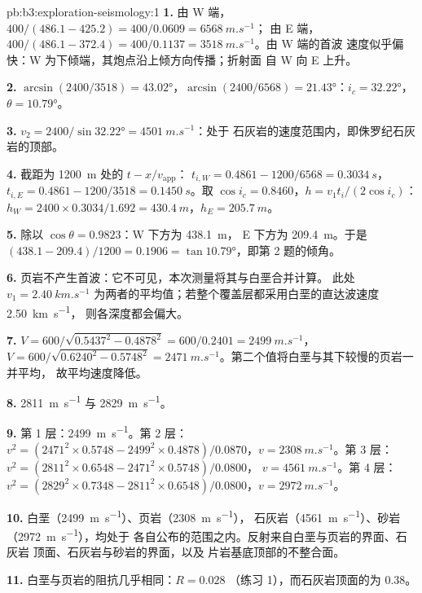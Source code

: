 \begin{solution}{pb:b3:exploration-seismology:1}
\textbf{1.} 由 W 端，$400/(486.1 - 425.2) = 400/0.0609 = \qty{6568}{m.s^{-1}}$；
由 E 端，$400/(486.1 - 372.4) = 400/0.1137 = \qty{3518}{m.s^{-1}}$。由 W 端的首波
速度似乎偏快：W 为下倾端，其炮点沿上倾方向传播；折射面
自 W 向 E 上升。

\textbf{2.} $\arcsin(2400/3518) = \ang{43.02}$，$\arcsin(2400/6568) =
\ang{21.43}$：$i_c = \ang{32.22}$，$\theta = \ang{10.79}$。

\textbf{3.} $v_2 = 2400/\sin\ang{32.22} = \qty{4501}{m.s^{-1}}$：处于
石灰岩的速度范围内，即侏罗纪石灰岩的顶部。

\textbf{4.} 截距为 \qty{1200}{m} 处的 $t - x/v_{\text{app}}$：
$t_{i,W} = 0.4861 - 1200/6568 = \qty{0.3034}{s}$，$t_{i,E} = 0.4861 -
1200/3518 = \qty{0.1450}{s}$。取 $\cos i_c = 0.8460$，$h = v_1t_i/(2\cos
i_c)$：$h_W = 2400\times0.3034/1.692 = \qty{430.4}{m}$，$h_E =
\qty{205.7}{m}$。

\textbf{5.} 除以 $\cos\theta = 0.9823$：W 下方为 \qty{438.1}{m}，
E 下方为 \qty{209.4}{m}。于是 $(438.1 - 209.4)/1200 = 0.1906 =
\tan\ang{10.79}$，即第 2 题的倾角。

\textbf{6.} 页岩不产生首波：它不可见，本次测量将其与白垩合并计算。
此处 $v_1 = \qty{2.40}{km.s^{-1}}$ 为两者的平均值；若整个覆盖层都采用白垩的直达波速度
\qty{2.50}{km.s^{-1}}，
则各深度都会偏大。

\textbf{7.} $V = 600/\sqrt{0.5437^2 - 0.4878^2} = 600/0.2401 =
\qty{2499}{m.s^{-1}}$，$V = 600/\sqrt{0.6240^2 - 0.5748^2} =
\qty{2471}{m.s^{-1}}$。第二个值将白垩与其下较慢的页岩一并平均，
故平均速度降低。

\textbf{8.} \qty{2811}{m.s^{-1}} 与 \qty{2829}{m.s^{-1}}。

\textbf{9.} 第 1 层：\qty{2499}{m.s^{-1}}。第 2 层：$v^2 = (2471^2\times0.5748
- 2499^2\times0.4878)/0.0870$，$v = \qty{2308}{m.s^{-1}}$。第 3 层：
$v^2 = (2811^2\times0.6548 - 2471^2\times0.5748)/0.0800$，
$v = \qty{4561}{m.s^{-1}}$。第 4 层：$v^2 = (2829^2\times0.7348 -
2811^2\times0.6548)/0.0800$，$v = \qty{2972}{m.s^{-1}}$。

\textbf{10.} 白垩（\qty{2499}{m.s^{-1}}）、页岩（\qty{2308}{m.s^{-1}}），
石灰岩（\qty{4561}{m.s^{-1}}）、砂岩（\qty{2972}{m.s^{-1}}），均处于
各自公布的范围之内。反射来自白垩与页岩的界面、石灰岩
顶面、石灰岩与砂岩的界面，以及
片岩基底顶部的不整合面。

\textbf{11.} 白垩与页岩的阻抗几乎相同：$R = 0.028$
（练习 1），而石灰岩顶面的为 0.38。


\end{solution}
